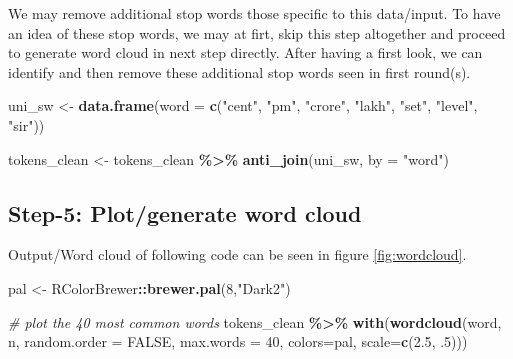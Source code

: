 \documentclass[
]{book}
\newenvironment{Shaded}{\begin{snugshade}}{\end{snugshade}}
\newcommand{\AttributeTok}[1]{\textcolor[rgb]{0.13,0.29,0.53}{#1}}
\newcommand{\CommentTok}[1]{\textcolor[rgb]{0.56,0.35,0.01}{\textit{#1}}}
\newcommand{\ConstantTok}[1]{\textcolor[rgb]{0.56,0.35,0.01}{#1}}
\newcommand{\DecValTok}[1]{\textcolor[rgb]{0.00,0.00,0.81}{#1}}
\newcommand{\FloatTok}[1]{\textcolor[rgb]{0.00,0.00,0.81}{#1}}
\newcommand{\FunctionTok}[1]{\textcolor[rgb]{0.13,0.29,0.53}{\textbf{#1}}}
\newcommand{\NormalTok}[1]{#1}
\newcommand{\OtherTok}[1]{\textcolor[rgb]{0.56,0.35,0.01}{#1}}
\newcommand{\SpecialCharTok}[1]{\textcolor[rgb]{0.81,0.36,0.00}{\textbf{#1}}}
\newcommand{\StringTok}[1]{\textcolor[rgb]{0.31,0.60,0.02}{#1}}
\begin{document}
We may remove additional stop words those specific to this data/input. To have an idea of these stop words, we may at firt, skip this step altogether and proceed to generate word cloud in next step directly. After having a first look, we can identify and then remove these additional stop words seen in first round(s).

\begin{Shaded}
\begin{Highlighting}[]
\NormalTok{uni\_sw }\OtherTok{\textless{}{-}} \FunctionTok{data.frame}\NormalTok{(}\AttributeTok{word =} \FunctionTok{c}\NormalTok{(}\StringTok{"cent"}\NormalTok{, }\StringTok{"pm"}\NormalTok{, }\StringTok{"crore"}\NormalTok{, }
                              \StringTok{"lakh"}\NormalTok{, }\StringTok{"set"}\NormalTok{,}
                              \StringTok{"level"}\NormalTok{, }\StringTok{"sir"}\NormalTok{))}

\NormalTok{tokens\_clean }\OtherTok{\textless{}{-}}\NormalTok{ tokens\_clean }\SpecialCharTok{\%\textgreater{}\%} 
  \FunctionTok{anti\_join}\NormalTok{(uni\_sw, }\AttributeTok{by =} \StringTok{"word"}\NormalTok{)}
\end{Highlighting}
\end{Shaded}

\hypertarget{step-5-plotgenerate-word-cloud}{%
\subsection{Step-5: Plot/generate word cloud}\label{step-5-plotgenerate-word-cloud}}

Output/Word cloud of following code can be seen in figure \ref{fig:wordcloud}.

\begin{Shaded}
\begin{Highlighting}[]
\NormalTok{pal }\OtherTok{\textless{}{-}}\NormalTok{ RColorBrewer}\SpecialCharTok{::}\FunctionTok{brewer.pal}\NormalTok{(}\DecValTok{8}\NormalTok{,}\StringTok{"Dark2"}\NormalTok{)}

\CommentTok{\# plot the 40 most common words}
\NormalTok{tokens\_clean }\SpecialCharTok{\%\textgreater{}\%} 
  \FunctionTok{with}\NormalTok{(}\FunctionTok{wordcloud}\NormalTok{(word, }
\NormalTok{                 n, }
                 \AttributeTok{random.order =} \ConstantTok{FALSE}\NormalTok{, }
                 \AttributeTok{max.words =} \DecValTok{40}\NormalTok{, }
                 \AttributeTok{colors=}\NormalTok{pal,}
                 \AttributeTok{scale=}\FunctionTok{c}\NormalTok{(}\FloatTok{2.5}\NormalTok{, .}\DecValTok{5}\NormalTok{)))}
\end{Highlighting}
\end{Shaded}
\end{document}
